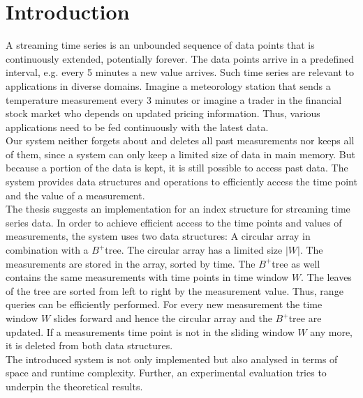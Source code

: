\documentclass[abstracton,12pt]{scrreprt}
\begin{document}
\tableofcontents
\listoffigures
\listoftables
\listofalgorithms
\renewcommand{\lstlistingname}{Algorithm}%




\chapter{Introduction}
A streaming time series is an unbounded sequence of data points that is continuously extended, potentially forever. The data points arrive in a predefined interval, e.g. every 5 minutes a new value arrives. Such time series are relevant to applications in diverse domains. Imagine a meteorology station that sends a temperature measurement every 3 minutes or imagine a trader in the financial stock market who depends on updated pricing information. Thus, various applications need to be fed continuously with the latest data. \\
Our system neither forgets about and deletes all past measurements nor keeps all of them, since a system can only keep a limited size of data in main memory. But because a portion of the data is kept, it is still possible to access past data. The system provides data structures and operations to efficiently access the time point and the value of a measurement.\\
The thesis suggests an implementation for an index structure for streaming time series data. In order to achieve efficient access to the time points and values of  measurements, the system uses two data structures: A circular array in combination with a $B^+$tree. The circular array has a limited size $|W|$. The measurements are stored in the array, sorted by time. The $B^+$tree as well contains the same measurements with time points in time window $W$. The leaves of the tree are sorted from left to right by the measurement value. Thus, range queries can be efficiently performed. For every new measurement the time window $W$ slides forward and hence the circular array and the $B^+$tree are updated. If a measurements time point is not in the sliding window $W$ any more, it is deleted from both data structures. 
\\The introduced system is not only implemented but also analysed in terms of space and runtime complexity. Further, an experimental evaluation tries to underpin the theoretical results.
\\ \\
\end{document}

